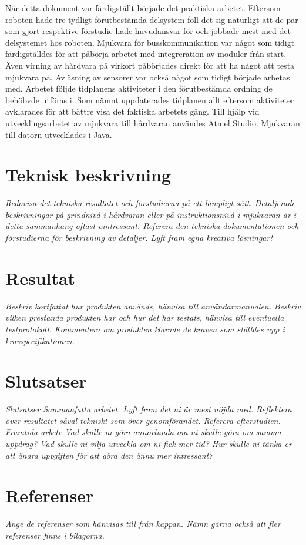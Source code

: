 \documentclass[11pt]{article}
\begin{document}
\begin{flushleft}
När detta dokument var färdigställt började det praktiska arbetet. Eftersom roboten hade tre tydligt förutbestämda delsystem föll det sig naturligt att de par som gjort respektive förstudie hade huvudansvar för och jobbade mest med det delsystemet hos roboten. Mjukvara för busskommunikation var något som tidigt färdigställdes för att påbörja arbetet med integreration av moduler från start. Även virning av hårdvara på virkort påbörjades direkt för att ha något att testa mjukvara på. Avläsning av sensorer var också något som tidigt började arbetas med. Arbetet följde tidplanens aktiviteter i den förutbestämda ordning de behöbvde utföras i. Som nämnt uppdaterades tidplanen allt eftersom aktiviteter avklarades för att bättre visa det faktiska arbetets gång. Till hjälp vid utvecklingsarbetet av mjukvara till hårdvaran användes Atmel Studio. Mjukvaran till datorn utvecklades i Java. 

\pagebreak

\section{Teknisk beskrivning}
\textit{Redovisa det tekniska resultatet och förstudierna på ett lämpligt sätt. Detaljerade beskrivningar på grindnivå i hårdvaran eller på instruktionsnivå i mjukvaran är i detta sammanhang oftast ointressant. Referera den tekniska dokumentationen och förstudierna för beskrivning av detaljer. Lyft fram egna kreativa lösningar!}
\pagebreak

\section{Resultat}
\textit{Beskriv kortfattat hur produkten används, hänvisa till användarmanualen.}
\textit{Beskriv vilken prestanda produkten har och hur det har testats, hänvisa till eventuella testprotokoll.}
\textit{Kommentera om produkten klarade de kraven som ställdes upp i kravspecifikationen. }

\pagebreak

\section{Slutsatser}
\textit{Slutsatser
Sammanfatta arbetet. 
Lyft fram det ni är mest nöjda med.
Reflektera över resultatet såväl tekniskt som över genomförandet. Referera efterstudien.}
\textit{Framtida arbete
Vad skulle ni göra annorlunda om ni skulle göra om samma uppdrag?
Vad skulle ni vilja utveckla om ni fick mer tid?
Hur skulle ni tänka er att ändra uppgiften för att göra den ännu mer intressant?}

\pagebreak

\section{Referenser}
\textit{Ange de referenser som hänvisas till från kappan. Nämn gärna också att fler referenser finns i bilagorna.}

\pagebreak
{}



\pagebreak


\appendix

\end{flushleft}
\end{document}

